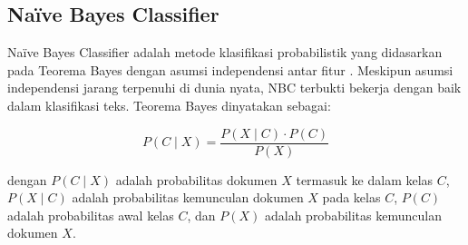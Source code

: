 \subsection{Na\"ive Bayes Classifier}

Na\"ive Bayes Classifier adalah metode klasifikasi probabilistik yang didasarkan pada Teorema Bayes dengan asumsi independensi antar fitur \cite{han2012}. Meskipun asumsi independensi jarang terpenuhi di dunia nyata, NBC terbukti bekerja dengan baik dalam klasifikasi teks. Teorema Bayes dinyatakan sebagai:

\begin{equation}
P(C \mid X) = \frac{P(X \mid C) \cdot P(C)}{P(X)}
\end{equation}

dengan $P(C \mid X)$ adalah probabilitas dokumen $X$ termasuk ke dalam kelas $C$, $P(X \mid C)$ adalah probabilitas kemunculan dokumen $X$ pada kelas $C$, $P(C)$ adalah probabilitas awal kelas $C$, dan $P(X)$ adalah probabilitas kemunculan dokumen $X$.
